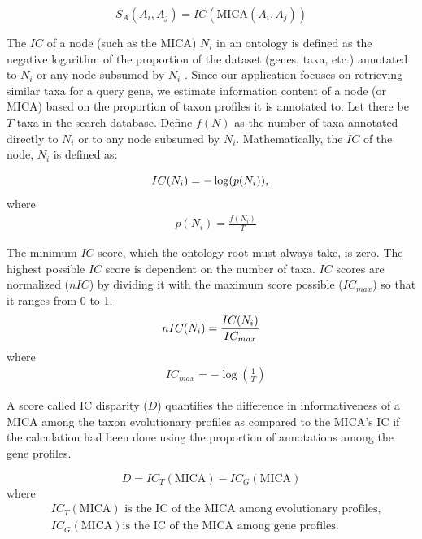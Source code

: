 \documentclass{article}
\begin{document}
\begin{equation}
\label{sa}
S_A (A_i,A_j) = IC(\textrm{MICA} (A_i,A_j))
\end{equation}

The $IC$ of a node (such as the MICA) $N_i$ in an ontology is defined as the negative logarithm of the proportion of the dataset (genes, taxa, etc.) annotated to $N_i$ or any node subsumed by $N_i$ \cite{resnik1999semantic}. Since our application focuses on retrieving similar taxa for a query gene, we estimate information content of a node (or MICA) based on the proportion of taxon profiles it is annotated to. Let there be $T$ taxa in the search database. Define $f(N)$ as the number of taxa annotated directly to $N_i$ or to any node subsumed by $N_i$. 
Mathematically, the $IC$ of the node, $N_i$ is defined as:

\begin{equation}
\label{IC}
IC(N_i) = -\log(p(N_i)), \\
\end{equation}
where
\begin{align*}
& p(N_i) = \frac{f(N_i)} {T}
\end{align*}

The minimum $IC$ score, which the ontology root must always take, is zero. The highest possible $IC$ score is dependent on the number of taxa. $IC$ scores are normalized ($nIC$) by dividing it with the maximum score possible ($IC_{max}$) so that it ranges from 0 to 1.
\begin{equation}
\label{nIC}
nIC(N_i)=\frac{IC(N_i)}{IC_{max}} \\
\end{equation}
where
\begin{align*}
& IC_{max}=-\log(\frac{1}{T})
\end{align*}


A score called IC disparity ($D$) quantifies the difference in informativeness of a MICA among the taxon evolutionary profiles as compared to the MICA's IC if the calculation had been done using the proportion of annotations among the gene profiles.

\begin{equation}
\label{disparity}
D=IC_T(\textrm{MICA})-IC_G(\textrm{MICA}) 
\end{equation}
where 
\begin{align*}
& IC_T(\textrm{MICA}) \textrm{ is the IC of the MICA among evolutionary profiles,} \\
& IC_G(\textrm{MICA}) \textrm{is the IC of the MICA among gene profiles.} \\
\end{align*}
\end{document}
